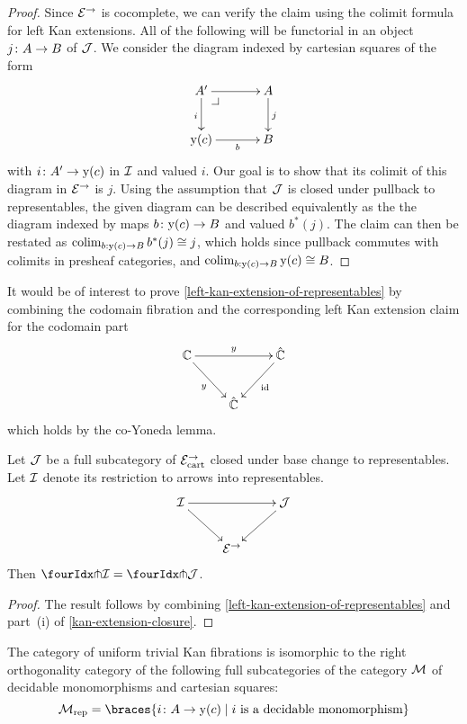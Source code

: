 \documentclass[reqno,10pt,a4paper,oneside,draft]{amsart}
\begin{document}
\begin{proof}
Since $\catE^\to$ is cocomplete, we can verify the claim using the colimit formula for left Kan extensions.
All of the following will be functorial in an object $j \co A \to B$ of $\cal{J}$.
We consider the diagram indexed by cartesian squares of the form
\[
\xymatrix@C=1.2cm{
  A'
  \ar[r]
  \ar[d]_{i}
  \pullback{dr}
&
  A
  \ar[d]^{j}
\\
  \yon(c)
  \ar[r]_-b
&
  B
}
\]
with $i \co A' \to \yon(c)$ in $\cal{I}$ and valued $i$.
Our goal is to show that its colimit of this diagram in $\catE^\to$ is $j$.
Using the assumption that $\cal{J}$ is closed under pullback to representables, the given diagram can be described equivalently as the the diagram indexed by maps $b \co \yon(c) \to B$ and valued $b^*(j)$.
The claim can then be restated as $\colim_{b : \yon(c) \to B} b^*(j) \iso j$, which holds since pullback commutes with colimits in presheaf categories, and $\colim_{b : \yon(c) \to B} \yon(c) \iso B$.
\end{proof}

\begin{remark}
It would be of interest to prove \cref{left-kan-extension-of-representables} by combining the codomain fibration and the corresponding left Kan extension claim for the codomain part
\[
\xymatrix{
  \cat{C}
  \ar[rr]^{y}
  \ar[dr]_{y}
&&
  \hat{\catC}
  \ar[dl]^{\id}
\\&
  \hat{\cat{C}}
}
\]
which holds by the co-Yoneda lemma.
\end{remark}

\begin{proposition} \label{awfs-on-arrows-into-representables}
Let $\cal{J}$ be a full subcategory of $\catE_{\cart}^\to$ closed under base change to representables.
Let $\cal{I}$ denote its restriction to arrows into representables.
\[
\xymatrix{
  \cal{I}
  \ar[rr]
  \ar[dr]
&&
  \cal{J}
  \ar[dl]
\\&
  \catE^\to
}
\]
Then $\liftr{\cal{I}} = \liftr{\cal{J}}$.
\end{proposition}

\begin{proof}
The result follows by combining \cref{left-kan-extension-of-representables} and part~(i) of \cref{kan-extension-closure}.
\end{proof}


\begin{lemma} \label{small-gen-triv-kan}
The category of uniform trivial Kan fibrations is isomorphic to the right orthogonality category of the following full subcategories of the category $\cal{M}$ of decidable monomorphisms and cartesian squares:
\[
  \cal{M}_{\textup{rep}} = \braces{i \co A \rightarrow \yon(c) \mid i \text{ is a decidable monomorphism} }
\]
\end{lemma}
\end{document}
